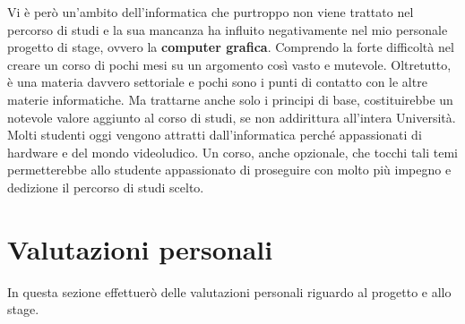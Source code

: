 Vi è però un'ambito dell'informatica che purtroppo non viene trattato nel percorso di studi e la sua mancanza ha influito negativamente nel mio personale progetto di stage, ovvero la \textbf{computer grafica}. Comprendo la forte difficoltà nel creare un corso di pochi mesi su un argomento così vasto e mutevole. Oltretutto, è una materia davvero settoriale e pochi sono i punti di contatto con le altre materie informatiche. Ma trattarne anche solo i principi di base, costituirebbe un notevole valore aggiunto al corso di studi, se non addirittura all'intera Università. Molti studenti oggi vengono attratti dall'informatica perché appassionati di hardware e del mondo videoludico. Un corso, anche opzionale, che tocchi tali temi permetterebbe allo studente appassionato di proseguire con molto più impegno e dedizione il percorso di studi scelto.  

\section{Valutazioni personali}

In questa sezione effettuerò delle valutazioni personali riguardo al progetto e allo stage.